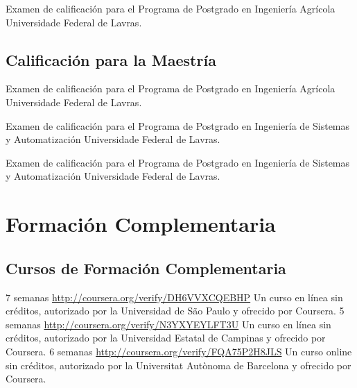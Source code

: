 \documentclass[11pt,a4paper,sans]{moderncv} %
\begin{document}
			{}
			{Examen de calificación para el Programa de Postgrado en Ingeniería Agrícola}{}
			{Universidade Federal de Lavras.}
			
\subsection{Calificación para la Maestría}
			{}
			{Examen de calificación para el Programa de Postgrado en Ingeniería Agrícola}{}
			{Universidade Federal de Lavras.}

			{}
			{Examen de calificación para el Programa de Postgrado en Ingeniería de Sistemas y Automatización}{}
			{Universidade Federal de Lavras.}

			{}
			{Examen de calificación para el Programa de Postgrado en Ingeniería de Sistemas y Automatización}{}
			{Universidade Federal de Lavras.}
\section{Formación Complementaria}

\subsection{ Cursos de Formación Complementaria }
	      {7 semanas}
	      {\url{http://coursera.org/verify/DH6VVXCQEBHP}}{}
	      {Un curso en línea sin créditos, autorizado por la Universidad de São Paulo y ofrecido por Coursera.}
	      {5 semanas}
	      {\url{http://coursera.org/verify/N3YXYEYLFT3U}}{}
	      {Un curso en línea sin créditos, autorizado por la Universidad Estatal de Campinas y ofrecido por Coursera.}
	      {6 semanas}
	      {\url{http://coursera.org/verify/FQA75P2H8JLS}}{}
	      {Un curso online sin créditos, autorizado por la Universitat Autònoma de Barcelona y ofrecido por Coursera.}
\end{document}
